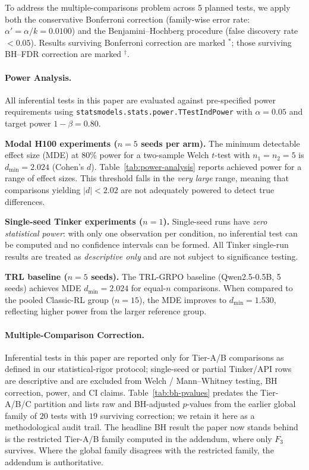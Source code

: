 \documentclass{article}  \usepackage[preprint,nonatbib]{neurips_2026} \usepackage[numbers]{natbib}
\begin{document}
To address the multiple-comparisons problem across 5 planned tests,
we apply both the conservative Bonferroni correction (family-wise error rate:
$\alpha' = \alpha / k = 0.0100$) and the Benjamini--Hochberg procedure
(false discovery rate $< 0.05$). Results surviving Bonferroni correction are
marked $^*$; those surviving BH--FDR correction are marked $^\dag$.

\paragraph{Power Analysis.}
All inferential tests in this paper are evaluated against pre-specified power
requirements using \texttt{statsmodels.stats.power.TTestIndPower} with
$\alpha = 0.05$ and target power $1 - \beta = 0.80$.

\textbf{Modal H100 experiments ($n = 5$ seeds per arm).}
The minimum detectable effect size (MDE) at 80\% power for a two-sample
Welch $t$-test with $n_1 = n_2 = 5$ is
$d_{\min} = 2.024$ (Cohen's $d$).
Table~\ref{tab:power-analysis} reports achieved power for a range of effect sizes.
This threshold falls in the \emph{very large} range, meaning that
comparisons yielding $|d| < 2.02$
are not adequately powered to detect true differences.

\textbf{Single-seed Tinker experiments ($n = 1$).}
Single-seed runs have \emph{zero statistical power}: with only one observation per
condition, no inferential test can be computed and no confidence intervals can be
formed.  All Tinker single-run results are treated as \emph{descriptive only} and
are not subject to significance testing.

\textbf{TRL baseline ($n = 5$ seeds).}
The TRL-GRPO baseline (Qwen2.5-0.5B, 5 seeds) achieves MDE
$d_{\min} = 2.024$ for equal-$n$ comparisons.
When compared to the pooled Classic-RL group ($n = 15$), the MDE
improves to $d_{\min} = 1.530$,
reflecting higher power from the larger reference group.

\paragraph{Multiple-Comparison Correction.}
Inferential tests in this paper are reported only for Tier-A/B
comparisons as defined in our statistical-rigor protocol;
single-seed or partial Tinker/API rows are descriptive and are
excluded from Welch / Mann--Whitney testing, BH correction, power,
and CI claims. Table~\ref{tab:bh-pvalues} predates the Tier-A/B/C
partition and lists raw and BH-adjusted $p$-values from the
earlier global family of $20$ tests with $19$ surviving correction;
we retain it here as a methodological audit trail. The headline
BH result the paper now stands behind is the restricted Tier-A/B
family computed in the addendum, where only $F_3$ survives. Where
the global family disagrees with the restricted family, the
addendum is authoritative.
\end{document}
